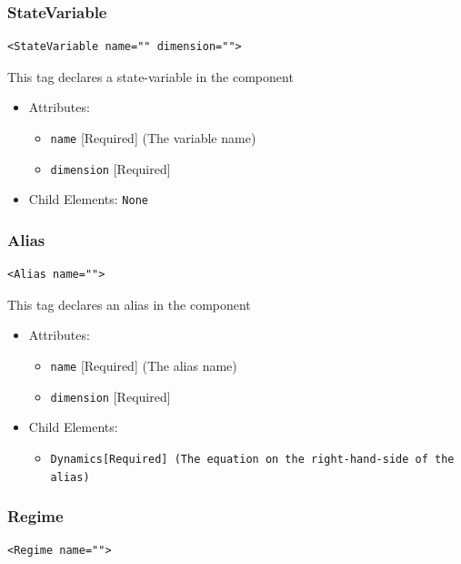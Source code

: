 \documentclass{article}
\newcommand{\MathInline}{\tt{Dynamics}}
\begin{document}
\subsubsection{StateVariable}
%
\begin{lstlisting}
<StateVariable name="" dimension="">
\end{lstlisting}

This tag declares a state-variable in the component

\begin{itemize}
\item Attributes:
%
\begin{itemize}
\item \verb|name| {[}Required{]} (The variable name)
\item \verb|dimension| {[}Required{]}
\end{itemize}

\item Child Elements: \texttt{None}
\end{itemize}

\subsubsection{Alias}
%
\begin{lstlisting}
<Alias name="">
\end{lstlisting}

This tag declares an alias in the component

\begin{itemize}
\item Attributes:
\begin{itemize}
\item \verb|name| {[}Required{]} (The alias name)
\item \verb|dimension| {[}Required{]}
\end{itemize}

\item Child Elements:
\begin{itemize}
\item \MathInline {[}Required{]} (The equation on the right-hand-side of the
alias)
\end{itemize}
\end{itemize}

\subsubsection{Regime}
%
\begin{lstlisting}
<Regime name="">
\end{lstlisting}
\end{document}
